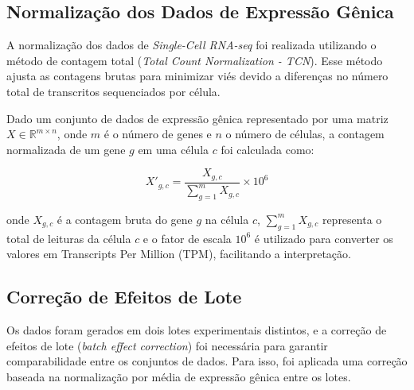 \documentclass[12pt]{article}
\begin{document}



\subsection{Normalização dos Dados de Expressão Gênica}

A normalização dos dados de \textit{Single-Cell RNA-seq} foi realizada utilizando o método de contagem total (\textit{Total Count Normalization - TCN}). Esse método ajusta as contagens brutas para minimizar viés devido a diferenças no número total de transcritos sequenciados por célula.

Dado um conjunto de dados de expressão gênica representado por uma matriz $X \in \mathbb{R}^{m \times n}$, onde $m$ é o número de genes e $n$ o número de células, a contagem normalizada de um gene $g$ em uma célula $c$ foi calculada como:

\begin{equation}
    X'_{g,c} = \frac{X_{g,c}}{\sum_{g=1}^{m} X_{g,c}} \times 10^6
\end{equation}

onde $X_{g,c}$ é a contagem bruta do gene $g$ na célula $c$, $\sum_{g=1}^{m} X_{g,c}$ representa o total de leituras da célula $c$ e o fator de escala $10^6$ é utilizado para converter os valores em Transcripts Per Million (TPM), facilitando a interpretação.

\subsection{Correção de Efeitos de Lote}

Os dados foram gerados em dois lotes experimentais distintos, e a correção de efeitos de lote (\textit{batch effect correction}) foi necessária para garantir comparabilidade entre os conjuntos de dados. Para isso, foi aplicada uma correção baseada na normalização por média de expressão gênica entre os lotes.
\end{document}
